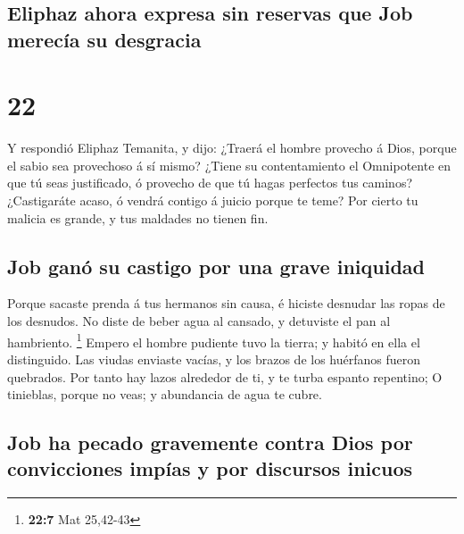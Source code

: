 \hypertarget{eliphaz-ahora-expresa-sin-reservas-que-job-merecuxeda-su-desgracia}{%
\subsection{Eliphaz ahora expresa sin reservas que Job merecía su
desgracia}\label{eliphaz-ahora-expresa-sin-reservas-que-job-merecuxeda-su-desgracia}}

\hypertarget{section-21}{%
\section{22}\label{section-21}}

 Y respondió Eliphaz Temanita, y dijo:  ¿Traerá
el hombre provecho á Dios, porque el sabio sea provechoso á sí mismo?
 ¿Tiene su contentamiento el Omnipotente en que tú seas
justificado, ó provecho de que tú hagas perfectos tus caminos?
 ¿Castigaráte acaso, ó vendrá contigo á juicio porque te
teme?  Por cierto tu malicia es grande, y tus maldades no
tienen fin.

\hypertarget{job-ganuxf3-su-castigo-por-una-grave-iniquidad}{%
\subsection{Job ganó su castigo por una grave
iniquidad}\label{job-ganuxf3-su-castigo-por-una-grave-iniquidad}}

 Porque sacaste prenda á tus hermanos sin causa, é hiciste
desnudar las ropas de los desnudos.  No diste de beber agua
al cansado, y detuviste el pan al hambriento. \footnote{\textbf{22:7}
  Mat 25,42-43}  Empero el hombre pudiente tuvo la tierra; y
habitó en ella el distinguido.  Las viudas enviaste vacías,
y los brazos de los huérfanos fueron quebrados.  Por tanto
hay lazos alrededor de ti, y te turba espanto repentino;  O
tinieblas, porque no veas; y abundancia de agua te cubre.

\hypertarget{job-ha-pecado-gravemente-contra-dios-por-convicciones-impuxedas-y-por-discursos-inicuos}{%
\subsection{Job ha pecado gravemente contra Dios por convicciones impías
y por discursos
inicuos}\label{job-ha-pecado-gravemente-contra-dios-por-convicciones-impuxedas-y-por-discursos-inicuos}}

